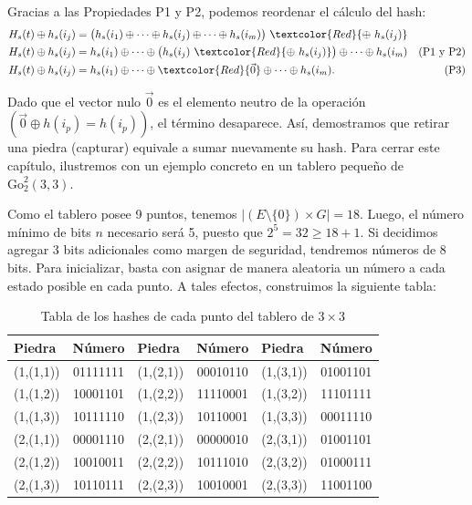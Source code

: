 Gracias a las Propiedades P1 y P2, podemos reordenar el cálculo del hash:
\begin{align*}
	H_s(t) \oplus h_s(i_{j}) &= \big( h_s(i_{1}) \oplus \dots \oplus h_s(i_{j}) \oplus \dots \oplus h_s(i_{m}) \big) \ \textcolor{Red}{\oplus \ h_s(i_{j})} \\
	H_s(t) \oplus h_s(i_{j}) &= h_s(i_{1}) \oplus \dots \oplus \big( h_s(i_{j}) \ \textcolor{Red}{\oplus \ h_s(i_{j})} \big) \oplus \dots \oplus h_s(i_{m}) & \text{(P1 y P2)} \\
	H_s(t) \oplus h_s(i_{j}) &= h_s(i_{1}) \oplus \dots \oplus \textcolor{Red}{\vec{0}} \oplus \dots \oplus h_s(i_{m}). & \text{(P3)}
\end{align*}

Dado que el vector nulo $\vec{0}$ es el elemento neutro de la operación $(\vec{0}\oplus h(i_{p})=h(i_{p}))$, el término desaparece. Así, demostramos que retirar una piedra (capturar) equivale a sumar nuevamente su hash. Para cerrar este capítulo, ilustremos con un ejemplo concreto en un tablero pequeño de $\mathrm{Go}^{2}_{2}(3,3)$.

Como el tablero posee 9 puntos, tenemos $|(E\setminus\{0\}) \times G| = 18$. Luego, el número mínimo de bits $n$ necesario será 5, puesto que $2^5 = 32 \geq 18 + 1$. Si decidimos agregar 3 bits adicionales como margen de seguridad, tendremos números de 8 bits. Para inicializar, basta con asignar de manera aleatoria un número a cada estado posible en cada punto. A tales efectos, construimos la siguiente tabla:
\begin{table}[H]
	\centering
	\small
	\begin{tabular}{lc|lc|lc}
		\textbf{Piedra} & \textbf{Número} & \textbf{Piedra} & \textbf{Número} & \textbf{Piedra} & \textbf{Número} \\ \hline
		(1,(1,1)) & 01111111 & (1,(2,1)) & 00010110 & (1,(3,1)) & 01001101 \\
		(1,(1,2)) & 10001101 & (1,(2,2)) & 11110001 & (1,(3,2)) & 11101111 \\
		(1,(1,3)) & 10111110 & (1,(2,3)) & 10110001 & (1,(3,3)) & 00011110 \\
		(2,(1,1)) & 00001110 & (2,(2,1)) & 00000010 & (2,(3,1)) & 01001101 \\
		(2,(1,2)) & 10010011 & (2,(2,2)) & 10111010 & (2,(3,2)) & 01000111 \\
		(2,(1,3)) & 10110111 & (2,(2,3)) & 10010001 & (2,(3,3)) & 11001100 \\
	\end{tabular}
	\caption{Tabla de los hashes de cada punto del tablero de $3\times 3$}
	\label{tablahash}
\end{table}

